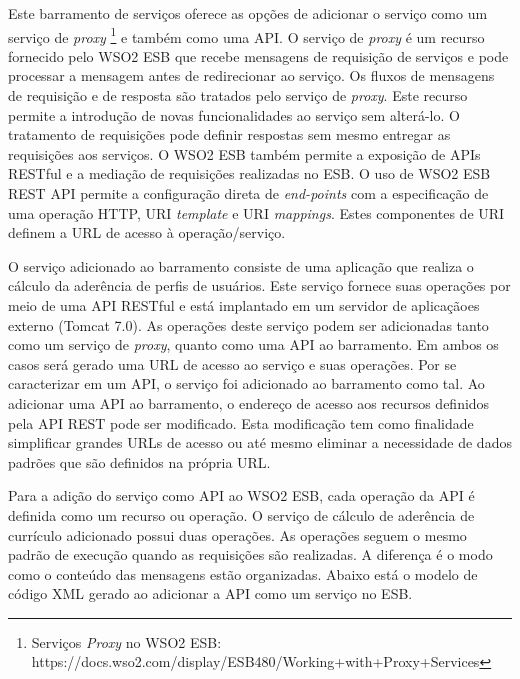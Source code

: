 Este barramento de serviços oferece as opções de adicionar o serviço como um serviço de \textit{proxy} \footnote{Serviços \textit{Proxy} no WSO2 ESB: https://docs.wso2.com/display/ESB480/Working+with+Proxy+Services} e também como uma API. O serviço de \textit{proxy} é um recurso fornecido pelo WSO2 ESB que recebe mensagens de requisição de serviços e pode processar a mensagem antes de redirecionar ao serviço. Os fluxos de mensagens de requisição e de resposta são tratados pelo serviço de \textit{proxy}. Este recurso permite a introdução de novas funcionalidades ao serviço sem alterá-lo. O tratamento de requisições pode definir respostas sem mesmo entregar as requisições aos serviços. O WSO2 ESB também permite a exposição de APIs RESTful e a mediação de requisições realizadas no ESB. O uso de WSO2 ESB REST API permite a configuração direta de \textit{end-points} com a especificação de uma operação HTTP, URI \textit{template} e URI \textit{mappings}. Estes componentes de URI definem a URL de acesso à operação/serviço.

O serviço adicionado ao barramento consiste de uma aplicação que realiza o cálculo da aderência de perfis de usuários. Este serviço fornece suas operações por meio de uma API RESTful e está implantado em um servidor de aplicaçãoes externo (Tomcat 7.0). As operações deste serviço podem ser adicionadas tanto como um serviço de \textit{proxy}, quanto como uma API ao barramento. Em ambos os casos será gerado uma URL de acesso ao serviço e suas operações. Por se caracterizar em um API, o serviço foi adicionado ao barramento como tal. Ao adicionar uma API ao barramento, o endereço de acesso aos recursos definidos pela API REST pode ser modificado. Esta modificação tem como finalidade simplificar grandes URLs de acesso ou até mesmo eliminar a necessidade de dados padrões que são definidos na própria URL.

Para a adição do serviço como API ao WSO2 ESB, cada operação da API é definida como um recurso ou operação. O serviço de cálculo de aderência de currículo adicionado possui duas operações. As operações seguem o mesmo padrão de execução quando as requisições são realizadas. A diferença é o modo como o conteúdo das mensagens estão organizadas. Abaixo está o modelo de código XML gerado ao adicionar a API como um serviço no ESB.


